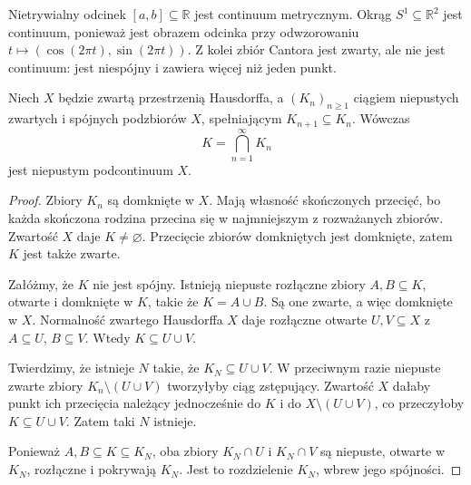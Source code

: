 \begin{przyklad}
\label{ex:topog25-basic}
Nietrywialny odcinek \([a,b]\subseteq\mathbb R\)
jest continuum metrycznym.
Okrąg \(S^1\subseteq\mathbb R^2\)
jest continuum, ponieważ jest obrazem
odcinka przy odwzorowaniu
\(t\mapsto(\cos(2\pi t),\sin(2\pi t))\).
Z kolei zbiór Cantora jest zwarty,
ale nie jest continuum:
jest niespójny i zawiera więcej niż jeden punkt.
\end{przyklad}

\begin{twierdzenie}
\label{thm:topog25-nested}
Niech \(X\) będzie zwartą przestrzenią Hausdorffa,
a \((K_n)_{n\ge1}\) ciągiem niepustych
zwartych i spójnych podzbiorów \(X\),
spełniającym \(K_{n+1}\subseteq K_n\).
Wówczas
\[
 K=\bigcap_{n=1}^{\infty}K_n
\]
jest niepustym podcontinuum \(X\).
\end{twierdzenie}
\begin{proof}
Zbiory \(K_n\) są domknięte w \(X\).
Mają własność skończonych przecięć,
bo każda skończona rodzina przecina się
w najmniejszym z rozważanych zbiorów.
Zwartość \(X\) daje \(K\neq\varnothing\).
Przecięcie zbiorów domkniętych
jest domknięte, zatem \(K\)
jest także zwarte.

Załóżmy, że \(K\) nie jest spójny.
Istnieją niepuste rozłączne zbiory
\(A,B\subseteq K\), otwarte i domknięte w \(K\),
takie że \(K=A\cup B\).
Są one zwarte, a więc domknięte w \(X\).
Normalność zwartego Hausdorffa \(X\)
daje rozłączne otwarte \(U,V\subseteq X\)
z \(A\subseteq U\), \(B\subseteq V\).
Wtedy \(K\subseteq U\cup V\).

Twierdzimy, że istnieje \(N\)
takie, że \(K_N\subseteq U\cup V\).
W przeciwnym razie niepuste
zwarte zbiory \(K_n\setminus(U\cup V)\)
tworzyłyby ciąg zstępujący.
Zwartość \(X\) dałaby punkt ich
przecięcia należący jednocześnie
do \(K\) i do \(X\setminus(U\cup V)\),
co przeczyłoby \(K\subseteq U\cup V\).
Zatem taki \(N\) istnieje.

Ponieważ \(A,B\subseteq K\subseteq K_N\),
oba zbiory \(K_N\cap U\) i \(K_N\cap V\)
są niepuste, otwarte w \(K_N\),
rozłączne i pokrywają \(K_N\).
Jest to rozdzielenie \(K_N\),
wbrew jego spójności.
\end{proof}

